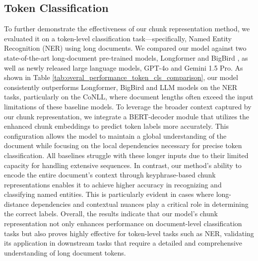 \documentclass[11pt]{article}
\begin{document}
\subsection{Token Classification}
To further demonstrate the effectiveness of our chunk representation method, we evaluated it on a token-level classification task—specifically, Named Entity Recognition (NER) using long documents. We compared our model against two state-of-the-art long-document pre-trained models, Longformer \citep{beltagy2020longformer} and BigBird \citep{zaheer2020big}, as well as newly released large language models, GPT-4o and Gemini 1.5 Pro. 
As shown in Table \ref{tab:overal_performance_token_cls_comparison}, our model consistently outperforms Longformer, BigBird and LLM models on the NER tasks, particularly on the CoNLL, where document lengths often exceed the input limitations of these baseline models. To leverage the broader context captured by our chunk representation, we integrate a BERT-decoder module that utilizes the enhanced chunk embeddings to predict token labels more accurately. This configuration allows the model to maintain a global understanding of the document while focusing on the local dependencies necessary for precise token classification.
All baselines struggle with these longer inputs due to their limited capacity for handling extensive sequences. In contrast, our method’s ability to encode the entire document’s context through keyphrase-based chunk representations enables it to achieve higher accuracy in recognizing and classifying named entities. This is particularly evident in cases where long-distance dependencies and contextual nuances play a critical role in determining the correct labels.
Overall, the results indicate that our model's chunk representation not only enhances performance on document-level classification tasks but also proves highly effective for token-level tasks such as NER, 
validating its application in downstream tasks that require a detailed and comprehensive understanding of long document tokens.
\end{document}

